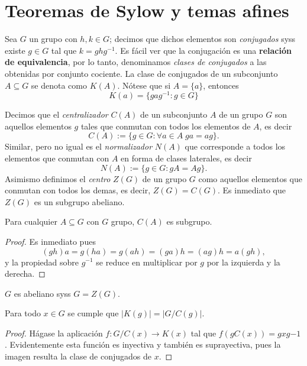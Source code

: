\documentclass[11pt,oneside]{book}
\begin{document}
\section{Teoremas de Sylow y temas afines}
\begin{mydef}[Conjugación]
Sea $G$ un grupo con $h,k\in G$; decimos que dichos elementos son \textit{conjugados} syss existe $g\in G$ tal que $k=ghg^{-1}$. Es fácil ver que la conjugación es una \textbf{relación de equivalencia}, por lo tanto, denominamos \textit{clases de conjugados} a las obtenidas por conjunto cociente. La clase de conjugados de un subconjunto $A\subseteq G$ se denota como $K(A)$. Nótese que si $A=\{a\}$, entonces
$$K(a)=\{gag^{-1}:g\in G\}$$ 
\end{mydef}
\begin{mydef}
Decimos que el \textit{centralizador} $C(A)$ de un subconjunto $A$ de un grupo $G$ son aquellos elementos $g$ tales que conmutan con todos los elementos de $A$, es decir
$$C(A):=\{g\in G:\forall a\in A\;ga=ag\}.$$ 
Similar, pero no igual es el \textit{normalizador} $N(A)$ que corresponde a todos los elementos que conmutan con $A$ en forma de clases laterales, es decir
$$N(A):=\{g\in G:gA=Ag\}.$$ 
Asimismo definimos el \textit{centro} $Z(G)$  de un grupo $G$ como aquellos elementos que conmutan con todos los demas, es decir, $Z(G)=C(G)$. Es inmediato que $Z(G)$ es un subgrupo abeliano.
\end{mydef}
\begin{thm}
Para cualquier $A\subseteq G$ con $G$ grupo, $C(A)$ es subgrupo.
\end{thm}
\begin{proof}
Es inmediato pues
$$(gh)a=g(ha)=g(ah)=(ga)h=(ag)h=a(gh),$$
y la propiedad sobre $g^{-1}$ se reduce en multiplicar por $g$ por la izquierda y la derecha.
\end{proof}
\begin{cor}
$G$ es abeliano syss $G=Z(G)$.
\end{cor}
\begin{lem}
Para todo $x\in G$ se cumple que $|K(g)|=|G/C(g)|$.
\end{lem}
\begin{proof}
Hágase la aplicación $f:G/C(x)\rightarrow K(x)$ tal que $f(gC(x))=gxg{-1}$. Evidentemente esta función es inyectiva y también es suprayectiva, pues la imagen resulta la clase de conjugados de $x$.
\end{proof}
\end{document}
